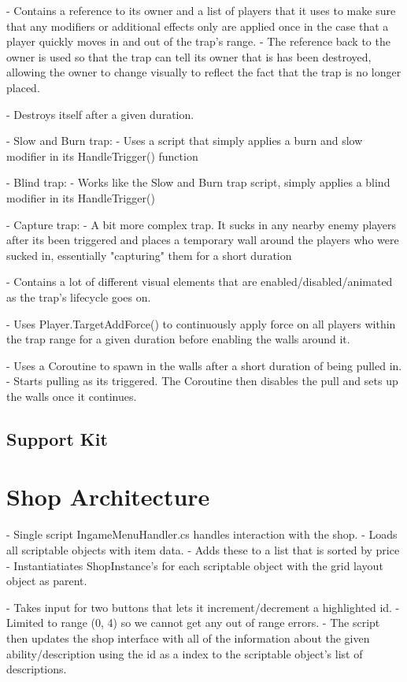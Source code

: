     - Contains a reference to its owner and a list of players that it uses to make sure that any modifiers or additional effects only are applied once in the case that a player quickly moves in and out of the trap's range. 
    - The reference back to the owner is used so that the trap can tell its owner that is has been destroyed, allowing the owner to change visually to reflect the fact that the trap is no longer placed.
    
    - Destroys itself after a given duration. 
    

- Slow and Burn trap:
    - Uses a script that simply applies a burn and slow modifier in its HandleTrigger() function

- Blind trap:
    - Works like the Slow and Burn trap script, simply applies a blind modifier in its HandleTrigger()

- Capture trap:
    - A bit more complex trap. It sucks in any nearby enemy players after its been triggered and places a temporary wall around the players who were sucked in, essentially "capturing" them for a short duration
    
    - Contains a lot of different visual elements that are enabled/disabled/animated as the trap's lifecycle goes on. 
    
    - Uses Player.TargetAddForce() to continuously apply force on all players within the trap range for a given duration before enabling the walls around it. 
    
    - Uses a Coroutine to spawn in the walls after a short duration of being pulled in.
        - Starts pulling as its triggered. The Coroutine then disables the pull and sets up the walls once it continues. 

\subsection{Support Kit}

\section{Shop Architecture}
- Single script IngameMenuHandler.cs handles interaction with the shop.
        - Loads all scriptable objects with item data. 
        - Adds these to a list that is sorted by price
        - Instantiatiates ShopInstance's for each scriptable object with the grid layout object as parent. 
        
        - Takes input for two buttons that lets it increment/decrement a highlighted id.
            - Limited to range (0, 4) so we cannot get any out of range errors.
        - The script then updates the shop interface with all of the information about the given ability/description using the id as a index to the scriptable object's list of descriptions.  


